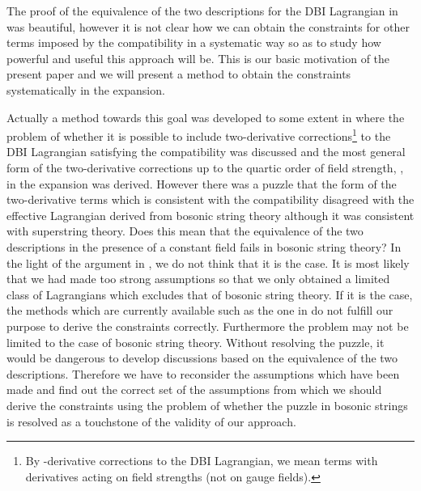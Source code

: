 \documentclass[a4paper,12pt]{article}
\begin{document}
The proof of
the equivalence of the two descriptions
for the DBI Lagrangian in \cite{SW}
was beautiful,
however it is not clear how we can obtain the constraints
for other terms
imposed by the compatibility in a systematic way
so as to study how powerful and useful this approach will be.
This is our basic motivation of the present paper
and we will present a method to obtain the constraints systematically
in the \coordHE{} expansion.

Actually a method towards this goal was developed
to some extent in \cite{Okawa}
where the problem of
whether it is possible to include
two-derivative corrections\footnote{
By \coordHE{}-derivative corrections to the DBI Lagrangian,
we mean terms with \coordHE{} derivatives acting on
field strengths (not on gauge fields).
} 
to the DBI Lagrangian satisfying the compatibility
was discussed
and the most general form of the two-derivative corrections
up to the quartic order of field strength, \coordHE{},
in the \coordHE{} expansion was derived.
However there was a puzzle that the form of the two-derivative terms
which is consistent with the compatibility
disagreed with
the effective Lagrangian derived from bosonic string theory
although it was consistent with superstring theory.
Does this mean that the equivalence of the two descriptions
in the presence of a constant \coordHE{} field
fails in bosonic string theory?
In the light of the argument in \cite{SW},
we do not think that it is the case.
It is most likely that we had made too strong assumptions
so that we only obtained a limited class of Lagrangians
which excludes that of bosonic string theory.
If it is the case, the methods which are currently available
such as the one in \cite{Okawa}
do not fulfill our purpose to derive the constraints correctly.
Furthermore the problem may not be limited to the case
of bosonic string theory.
Without resolving the puzzle, it would be dangerous
to develop discussions based on the equivalence
of the two descriptions.
Therefore we have to reconsider the assumptions which have been made
and find out the correct set of the assumptions from which
we should derive the constraints
using the problem of
whether the puzzle in bosonic strings is resolved
as a touchstone of the validity of our approach.
\end{document}

